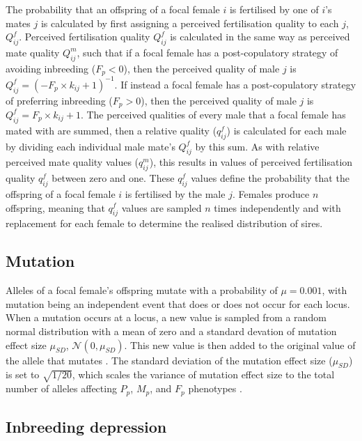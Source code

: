 \documentclass[10pt,letterpaper]{article}
\begin{document}
The probability that an offspring of a focal female $i$ is fertilised by one of $i$'s mates $j$ is calculated by first assigning a perceived fertilisation quality to each $j$, $Q^{f}_{ij}$. Perceived fertilisation quality $Q^{f}_{ij}$ is calculated in the same way as perceived mate quality $Q^{m}_{ij}$, such that if a focal female has a post-copulatory strategy of avoiding inbreeding ($F_{p}<0$), then the perceived quality of male $j$ is $Q^{f}_{ij} = (-F_{p} \times k_{ij} + 1)^{-1}$. If instead a focal female has a post-copulatory strategy of preferring inbreeding ($F_{p}>0$), then the perceived quality of male $j$ is $Q^{f}_{ij} = F_{p} \times k_{ij} + 1$. The perceived qualities of every male that a focal female has mated with are summed, then a relative quality ($q^{f}_{ij}$) is calculated for each male by dividing each individual male mate's $Q^{f}_{ij}$ by this sum. As with relative perceived mate quality values ($q^{m}_{ij}$), this results in values of perceived fertilisation quality $q^{f}_{ij}$ between zero and one. These $q^{f}_{ij}$ values define the probability that the offspring of a focal female $i$ is fertilised by the male $j$. Females produce $n$ offspring, meaning that $q^{f}_{ij}$ values are sampled $n$ times independently and with replacement for each female to determine the realised distribution of sires.

\subsection*{Mutation}

Alleles of a focal female's offspring mutate with a probability of $\mu=0.001$, with mutation being an independent event that does or does not occur for each locus. When a mutation occurs at a locus, a new value is sampled from a random normal distribution with a mean of zero and a standard devation of mutation effect size $\mu_{SD}$, $\mathcal{N}(0, \mu_{SD})$. This new value is then added to the original value of the allele that mutates \cite[][]{Kimura1965, Lande1976, Bocedi2014, Duthie}. The standard deviation of the mutation effect size ($\mu_{SD}$) is set to $\sqrt{1/20}$, which scales the variance of mutation effect size to the total number of alleles affecting $P_{p}$, $M_{p}$, and $F_{p}$ phenotypes \cite[see][]{Kimura1965, Lande1976, Bocedi2014}.

\subsection*{Inbreeding depression}
\end{document}
